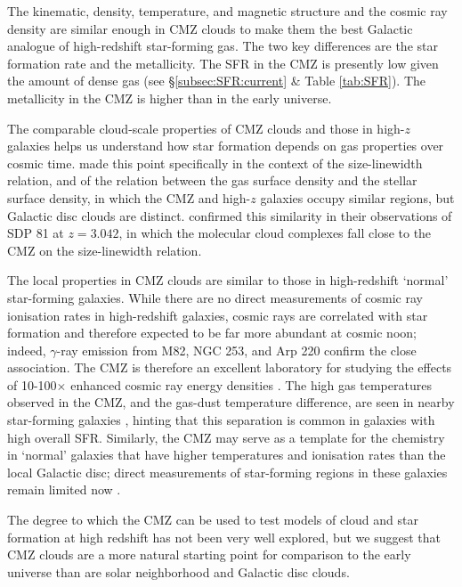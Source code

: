 The kinematic, density, temperature, and magnetic structure and the cosmic ray density are similar enough in CMZ clouds to make them the best Galactic analogue of high-redshift star-forming gas. 
The two key differences are the star formation rate and the metallicity.
The SFR in the CMZ is presently low given the amount of dense gas (see \S \ref{subsec:SFR:current} \& Table \ref{tab:SFR}).
The metallicity in the CMZ \citep[$Z\sim2$;][]{Rudolph2006} is higher than in the early universe.

The comparable cloud-scale properties of CMZ clouds and those in high-$z$ galaxies helps us understand how star formation depends on gas properties over cosmic time.
\citet{Kruijssen2013} made this point specifically in the context of the size-linewidth relation, and of the relation between the gas surface density and the stellar surface density, in which the CMZ and high-$z$ galaxies occupy similar regions, but Galactic disc clouds are distinct.
\citet{Swinbank2015} confirmed this similarity in their observations of SDP 81 at $z=3.042$, in which the molecular cloud complexes fall close to the CMZ on the size-linewidth relation.

The local properties in CMZ clouds are similar to those in high-redshift `normal' star-forming galaxies.
While there are no direct measurements of cosmic ray ionisation rates in high-redshift galaxies, cosmic rays are correlated with star formation and therefore expected to be far more abundant at cosmic noon; indeed, $\gamma$-ray emission from M82, NGC 253, and Arp 220 \citep{VERITASCollaboration2009,Lacki2011,H.E.S.S.Collaboration2018,Yoast-Hull2017} confirm the close association. 
The CMZ is therefore an excellent laboratory for studying the effects of 10-100$\times$ enhanced cosmic ray energy densities \citep{Yoast-Hull2014b, Yoast-Hull2014a}.
The high gas temperatures observed in the CMZ, and the gas-dust temperature difference, are seen in nearby star-forming galaxies \citep{Mangum2013,Mangum2019}, hinting that this separation is common in galaxies with high overall SFR.
Similarly, the CMZ may serve as a template for the chemistry in `normal' galaxies that have higher temperatures and ionisation rates than the local Galactic disc; direct measurements of star-forming regions in these galaxies remain limited now \citep[e.g.][]{Meier2005,Harada2019}.

The degree to which the CMZ can be used to test models of cloud and star formation at high redshift has not been very well explored, but we suggest that CMZ clouds are a more natural starting point for comparison to the early universe than are solar neighborhood and Galactic disc clouds.

